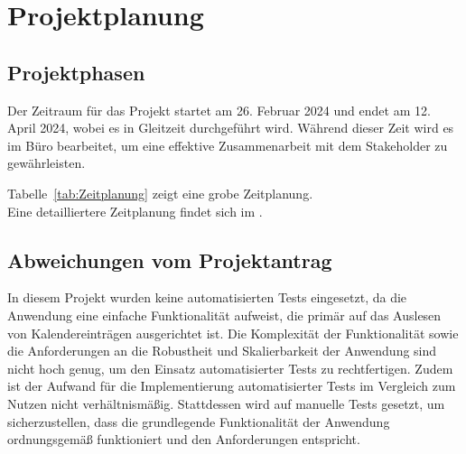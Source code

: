 \section{Projektplanung} 
\label{sec:Projektplanung}


\subsection{Projektphasen}
\label{sec:Projektphasen}

Der Zeitraum für das Projekt startet am 26. Februar 2024 und endet am 12. April 2024, wobei es in Gleitzeit durchgeführt wird.
Während dieser Zeit wird es im Büro bearbeitet, um eine effektive Zusammenarbeit mit dem Stakeholder zu gewährleisten.

Tabelle~\ref{tab:Zeitplanung} zeigt eine grobe Zeitplanung.
\\
Eine detailliertere Zeitplanung findet sich im .


\subsection{Abweichungen vom Projektantrag}
\label{sec:AbweichungenProjektantrag}
In diesem Projekt wurden keine automatisierten Tests eingesetzt, da die Anwendung eine einfache Funktionalität aufweist, die primär auf das Auslesen von Kalendereinträgen ausgerichtet ist.
Die Komplexität der Funktionalität sowie die Anforderungen an die Robustheit und Skalierbarkeit der Anwendung sind nicht hoch genug, um den Einsatz automatisierter Tests zu rechtfertigen.
Zudem ist der Aufwand für die Implementierung automatisierter Tests im Vergleich zum Nutzen nicht verhältnismäßig.
Stattdessen wird auf manuelle Tests gesetzt, um sicherzustellen, dass die grundlegende Funktionalität der Anwendung ordnungsgemäß funktioniert und den Anforderungen entspricht.


